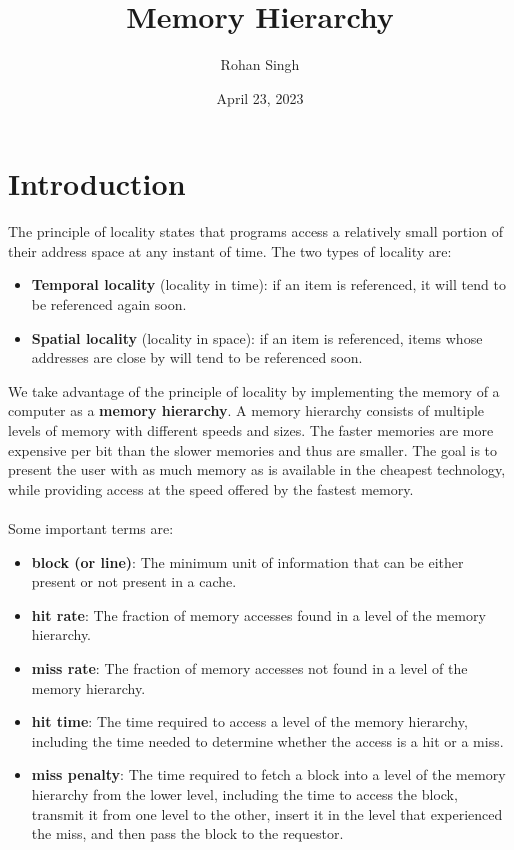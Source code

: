 \documentclass[letterpaper,c12pt]{article}
\title{Memory Hierarchy}
\author{Rohan Singh}
\date{April 23, 2023}
\begin{document}
	
\maketitle

\section{Introduction}
The principle of locality states that programs access a relatively small portion of their address space at any instant of time. The two types of locality are: 
\begin{itemize}
	\item \textbf{Temporal locality} (locality in time): if an item is referenced, it will tend to be referenced again soon.
	\item \textbf{Spatial locality} (locality in space): if an item is referenced, items whose addresses are close by will tend to be referenced soon.
\end{itemize}
We take advantage of the principle of locality by implementing the memory of a computer as a \textbf{memory hierarchy}. A memory hierarchy consists of multiple levels of memory with different speeds and sizes. The faster memories are more expensive per bit than the slower memories and thus are smaller. The goal is to present the user with as much memory as is available in the cheapest technology, while providing access at the speed offered by the fastest memory.\\\\
Some important terms are:
\begin{itemize}
	\item \textbf{block (or line)}: The minimum unit of information that can be either present or not present in a cache.
	\item \textbf{hit rate}: The fraction of memory accesses found in a level of the memory hierarchy.
	\item \textbf{miss rate}: The fraction of memory accesses not found in a level of the memory hierarchy.
	\item \textbf{hit time}: The time required to access a level of the memory hierarchy, including the time needed to determine whether the access is a hit or a miss.
	\item \textbf{miss penalty}: The time required to fetch a block into a level of the memory hierarchy from the lower level, including the time to access the block, transmit it from one level to the other, insert it in the level that experienced the miss, and then pass the block to the requestor.
\end{itemize}
\end{document}
